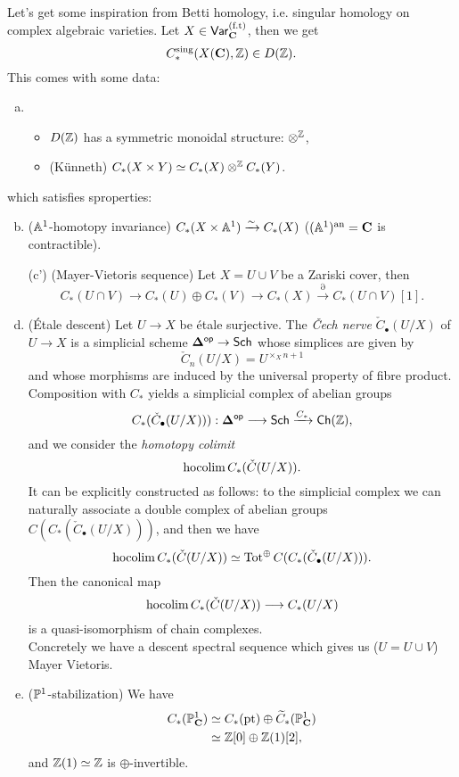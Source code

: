 Let's get some inspiration from Betti homology, i.e. singular homology on complex
algebraic varieties. Let $X\in \cat{Var}_{\bb{C}}\ft$, then we get
\[
C_*^{\text{sing}}(X(\bb{C}),\Z)\in D(\Z)
.\]
This comes with some data:
\begin{enumerate}[(a)]
\item
\begin{itemize}
\item $D(\Z)$ has a symmetric monoidal structure: $\otimes^{\Z}$,
\item (K\"unneth) $C_*(X\times Y) \simeq C_*(X)\otimes^{\Z}C_*(Y)$.
\end{itemize}
\end{enumerate}
which satisfies sproperties:
\begin{enumerate}[(a)]
\setcounter{enumi}{1}
\item ($\Aff^{1}$-homotopy invariance) $C_*(X\times \Aff^{1})\simto C_*(X)$
($(\Aff^{1})\an=\bb{C}$ is contractible).
\item[(c')] (Mayer-Vietoris sequence) Let $X=U \cup V$ be a Zariski cover, then
\[
C_*(U\cap V) \to C_*(U) \oplus C_*(V) \to C_*(X) \xrightarrow{\partial} C_*(U \cap  V)[1]
.\]
\item (\'Etale descent) Let $U\to X$ be \'etale surjective. The
\textit{Čech nerve} $\check{C}_\bullet(U /X)$ of $U\to X$ is a simplicial scheme
$\bb{\Delta}\op\to \Sch$ whose
simplices are given by
\[
\check{C}_n(U /X) = U^{\times_X n+1}
\]
and whose morphisms are induced by the universal property of fibre product.\\
Composition with $C_*$ yields a simplicial complex of abelian groups
\[C_*(\check{C}_\bullet(U /X))):\bb{\Delta}\op\to \Sch \xrightarrow{C_*} \Ch(\Z),\]
and we consider the \textit{homotopy colimit}
\[ \hocolim C_*(\check{C}(U /X)). \]
It can be explicitly constructed as follows: to the simplicial complex we can naturally
associate a double complex of abelian groups
$C(C_*(\check{C}_\bullet(U /X)))$, and then we have
\[ \hocolim C_*(\check{C}(U /X))\isoto \Tot^{\oplus} C(C_*(\check{C}_\bullet(U /X))). \]
Then the canonical map
\[  \hocolim C_*(\check{C}(U /X))\to C_*(U /X)  \]
is a quasi-isomorphism of chain complexes.\\
Concretely we have a descent spectral sequence which gives us ($U=U \cup V$) Mayer Vietoris.
\item ($\P^{1}$-stabilization) We have
\begin{align*}
C_*(\P_{\bb{C}}^{1}) &\simeq C_*(\text{pt}) \oplus \wt{C}_*(\P_{\bb{C}}^{1}) \\
&\simeq \Z[0] \oplus \Z(1)[2]
,
\end{align*}
and $\Z(1)\isoto \Z$ is $\oplus$-invertible.
\end{enumerate}
